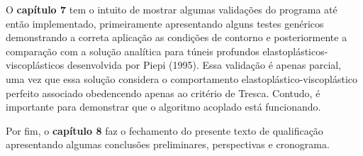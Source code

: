 O \textbf{capítulo 7} tem o intuito de mostrar algumas validações do programa até então implementado, primeiramente apresentando alguns testes genéricos demonstrando a correta aplicação as condições de contorno e posteriormente a comparação com a solução analítica para túneis profundos elastoplásticos-viscoplásticos desenvolvida por Piepi (1995). Essa validação é apenas parcial, uma vez que essa solução considera o comportamento elastoplástico-viscoplástico perfeito associado obedencendo apenas ao critério de Tresca. Contudo, é importante para demonstrar que o algoritmo acoplado está funcionando.

Por fim, o \textbf{capítulo 8} faz o fechamento do presente texto de qualificação apresentando algumas conclusões preliminares, perspectivas e cronograma.


 
